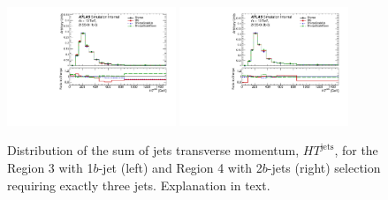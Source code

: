 \begin{figure}[!htb]
\centering
\includegraphics[width=0.45\textwidth]{Plots/ttV/shape/c_Region_2_HT_jets}
\includegraphics[width=0.45\textwidth]{Plots/ttV/shape/c_Region_3_HT_jets}\\
  \caption{Distribution of the sum of jets transverse momentum, $HT^{\text{jets}}$, for the Region 3 with 1$b$-jet (left) and Region 4 with 2$b$-jets (right) selection requiring exactly three jets. Explanation in text. \label{ttV:3j12b}}
\end{figure}


